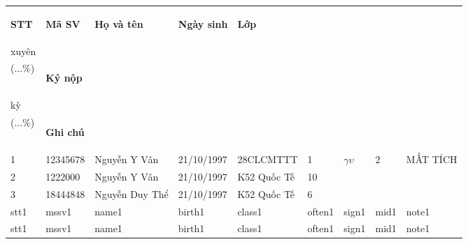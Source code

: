 \documentclass[14pt,a4paper]{article}
\begin{document}
\begin{tabular}{ m{0.7cm} | m{2cm}| m{4cm} | m{2cm} | m{2.5cm} | m{1.2cm} | m{1.5cm} | m{1cm} | m{1.6cm} | }
		\toprule[0.4mm]
		\begin{center}\textbf{STT }\end{center}&\begin{center}\textbf{Mã SV}\end{center} &\begin{center}\textbf{Họ và tên}\end{center} &\begin{center} \textbf{Ngày sinh}\end{center} &\begin{center} \textbf{Lớp}\end{center} &\vspace{-0.2cm}\begin{center} \textbf{Thường\vspace{-0.2cm}\\xuyên\vspace{-0.2cm}\\(...\%)\vspace{-0.6cm} }\end{center} & \begin{center} \textbf{Ký nộp }\end{center}&\vspace{-0.2cm}\begin{center} \textbf{Giữa\vspace{-0.2cm}\\kỳ\vspace{-0.2cm}\\(...\%)\vspace{-0.6cm} }\end{center} &\begin{center} \textbf{Ghi chú}\vspace{-0cm}\end{center}\\
		\hline
		1 & 12345678 & Nguyễn Y Vân & 21/10/1997 & 28CLCMTTT & 1 & $ \gamma\upsilon $ & 2 & MẤT TÍCH\\
		\hline
		2 & 1222000 & Nguyễn Y Vân & 21/10/1997 & K52 Quốc Tế & 10 & & & \\
		\hline
		3 & 18444848 & Nguyễn Duy Thể & 21/10/1997 & K52 Quốc Tế & 6 & & & \\
		\hline
		stt1 & mssv1 & name1 & birth1 & class1 & often1 & sign1 & mid1 & note1\\
		\hline
		stt1 & mssv1 & name1 & birth1 & class1 & often1 & sign1 & mid1 & note1\\

\end{tabular}
\end{document}
